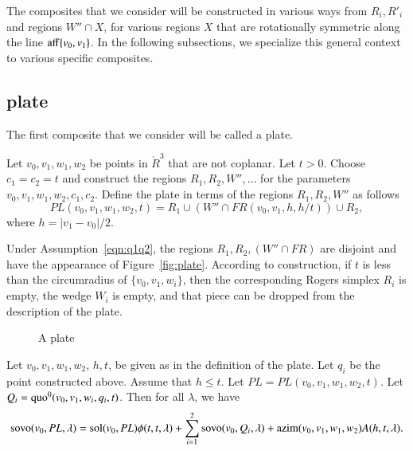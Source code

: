 The composites that we consider will be constructed in various
ways from $R_i,R'_i$ and regions $W''\cap X$, for various regions
$X$ that are rotationally symmetric along the line ${\operatorname{aff}}\{v_0,v_1\}$.
In the following subsections, we specialize this general
context to various specific composites.

\subsection{plate}

The first composite that we consider will be called a plate.

\begin{definition}[plate,~PL]
Let $v_0,v_1,w_1,w_2$ be points in $\ring{R}^3$ that are not
coplanar.  Let $t > 0$.  Choose $c_1=c_2=t$ and construct
the regions $R_1,R_2,W'',\ldots$ for the parameters 
$v_0,v_1,w_1,w_2,c_1,c_2$.
Define the plate in terms of the regions $R_1,R_2,W''$ as follows
  $$
  PL(v_0,v_1,w_1,w_2,t) = 
  R_1 \cup (W''\cap FR(v_0,v_1,h,h/t))\cup R_2,
  $$
where $h = |v_1-v_0|/2$.
\end{definition}

Under Assumption~\ref{eqn:q1q2}, the regions $R_1,R_2,(W''\cap FR)$
are disjoint and have the appearance of Figure~\ref{fig:plate}.
According to construction, if $t$ is less than the circumradius
of $\{v_0,v_1,w_i\}$, then the corresponding Rogers simplex $R_i$
is empty, the wedge $W_i$ is empty, and that piece can be dropped
from the description of the plate.

\begin{figure}[htb]
  \centering
  \caption{A plate}
\end{figure}


\begin{lemma}
Let $v_0,v_1,w_1,w_2$, $h,t$, be given as in the definition of
the plate. Let $q_i$ be the point constructed above. 
Assume that $h\le t$.  
Let $PL=PL(v_0,v_1,w_1,w_2,t)$.
Let $Q_i=\operatorname{quo}^0(v_0,v_1,w_i,q_i,t)$.
Then for all $\lambda$, we have
  $$
  {\operatorname{sovo}}(v_0,PL,\lambda) = 
  \operatorname{sol}(v_0,PL)\phi(t,t,\lambda) + 
  \sum_{i=1}^2{\operatorname{sovo}}(v_0,Q_i,\lambda) +
  {\operatorname{azim}}(v_0,v_1,w_1,w_2) A(h,t,\lambda).
  $$
\end{lemma}

